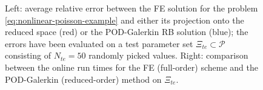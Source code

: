 \documentclass[12pt, a4paper, twoside, openright]{report}
\numberwithin{equation}{chapter}
\theoremstyle{theorem}
\theoremstyle{definition}
\theoremstyle{remark}
\theoremstyle{proposition}
\numberwithin{figure}{chapter}
\begin{document}
\begin{figure}[t]
						
			\caption{Left: average relative error between the FE solution for the problem \eqref{eq:nonlinear-poisson-example} and either its projection onto the reduced space (red) or the POD-Galerkin RB solution (blue); the errors have been evaluated on a test parameter set $\Xi_{te} \subset \mathcal{P}$ consisting of $N_{te} = 50$ randomly picked values. Right: comparison between the online run times for the FE (full-order) scheme and the POD-Galerkin (reduced-order) method on $\Xi_{te}$.}
			\label{fig:nonlinear-poisson-example}
		\end{figure}
						
\end{document}
